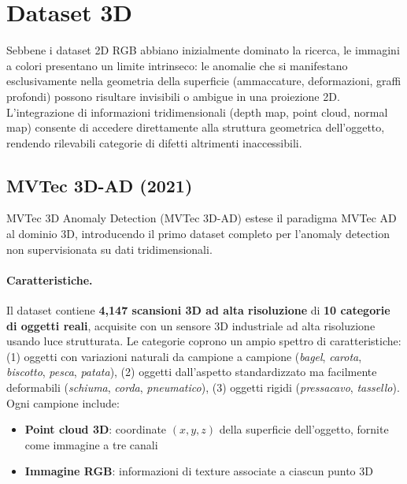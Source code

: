 \section{Dataset 3D}
\label{sec:dataset_3d}

Sebbene i dataset 2D RGB abbiano inizialmente dominato la ricerca, le immagini a colori presentano un limite intrinseco: le anomalie che si manifestano esclusivamente nella geometria della superficie (ammaccature, deformazioni, graffi profondi) possono risultare invisibili o ambigue in una proiezione 2D. L'integrazione di informazioni tridimensionali (depth map, point cloud, normal map) consente di accedere direttamente alla struttura geometrica dell'oggetto, rendendo rilevabili categorie di difetti altrimenti inaccessibili.


\subsection{MVTec 3D-AD (2021)}
\label{sec:mvtec_3d}
MVTec 3D Anomaly Detection (MVTec 3D-AD) \cite{bergmann2021mvtec3d} estese il paradigma MVTec AD al dominio 3D, introducendo il primo dataset completo per l'anomaly detection non supervisionata su dati tridimensionali.

\paragraph{Caratteristiche.} 
Il dataset contiene \textbf{4,147 scansioni 3D ad alta ri\-so\-lu\-zio\-ne} di \textbf{10 categorie di oggetti reali}, acquisite con un sensore 3D industriale ad alta risoluzione usando luce strutturata. Le categorie coprono un ampio spettro di caratteristiche: (1) oggetti con variazioni naturali da campione a campione (\textit{bagel}, \textit{carota}, \textit{biscotto}, \textit{pesca}, \textit{patata}), (2) oggetti dall'aspetto standardizzato ma facilmente deformabili (\textit{schiuma}, \textit{corda}, \textit{pneumatico}), (3) oggetti rigidi (\textit{pressacavo}, \textit{tassello}). Ogni campione include:

\begin{itemize}
    \item \textbf{Point cloud 3D}: coordinate $(x,y,z)$ della superficie dell'oggetto, fornite come immagine a tre canali
    \item \textbf{Immagine RGB}: informazioni di texture associate a ciascun punto 3D
\end{itemize}

